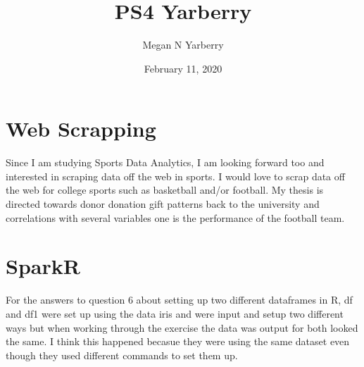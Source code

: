 \documentclass{article}
\title{PS4 Yarberry}
\author{Megan N Yarberry }
\date{February 11, 2020}
\begin{document}
\maketitle

\section{Web Scrapping}
Since I am studying Sports Data Analytics, I am looking forward too and interested in scraping data off the web in sports. I would love to scrap data off the web for college sports such as basketball and/or football. My thesis is directed towards donor donation gift patterns back to the university and correlations with several variables one is the performance of the football team. 

\section{SparkR}
For the answers to question 6 about setting up two different dataframes in R, df and df1 were set up using the data iris and were input and setup two different ways but when working through the exercise the data was output for both looked the same. I think this happened becasue they were using the same dataset even though they used different commands to set them up. 
\end{document}
